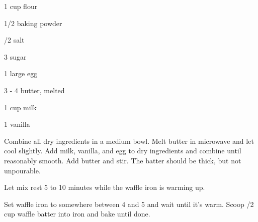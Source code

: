 %
%
%
%
\newpage



\begin{IngredientsAndSteps}
    \ListIngredientsAndSteps
    {
        1 cup flour

        1/2 \tsp[s] baking powder

        /2 \tsp salt

        3 \Tbl[s] sugar

        1 large egg

        3 - 4 \Tbl[s] butter, melted

        1 cup milk

        1 \tsp vanilla
    }
    {
        Combine all dry ingredients in a medium bowl. Melt butter in
        microwave and let cool slightly. Add milk, vanilla, and egg to
        dry ingredients and combine until reasonably smooth. Add butter and stir.
        The batter should be thick, but not unpourable.

        Let mix rest 5 to 10 minutes while the waffle iron is warming up.

        Set waffle iron to somewhere between 4 and 5 and wait until it's warm.
        Scoop /2 cup waffle batter into iron and bake until done.
    }
\end{IngredientsAndSteps}

